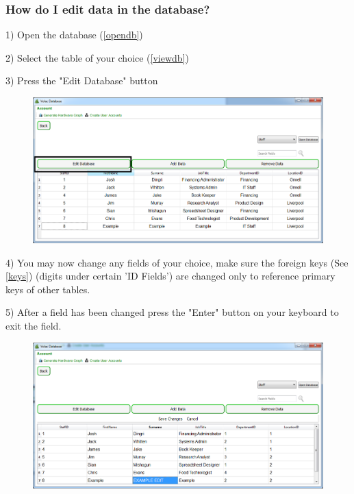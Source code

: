 \subsubsection{How do I edit data in the database?}\label{editdata}

1) Open the database (\ref{opendb})

2) Select the table of your choice (\ref{viewdb})

3) Press the "Edit Database" button 

\begin{figure}[H]
    \includegraphics[width=\textwidth]{./Manual/Images/editdata.png}
\end{figure}

4) You may now change any fields of your choice, make sure the foreign keys (See \ref{keys}) (digits under certain 'ID Fields') are changed only to reference primary keys of other tables.

5) After a field has been changed press the "Enter" button on your keyboard to exit the field.

\begin{figure}[H]
    \includegraphics[width=\textwidth]{./Manual/Images/editdata2.png}
\end{figure}

